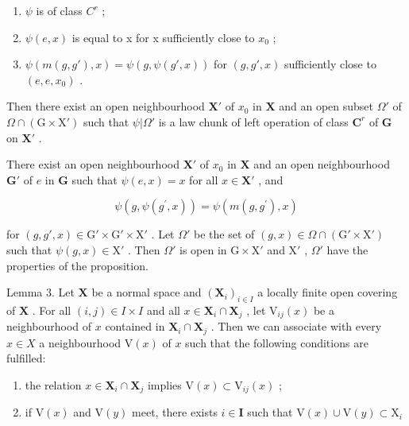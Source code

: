 \begin{enumerate}
\def\labelenumi{(\roman{enumi})}
\item
  \(\psi\) is of class \(C^{r}\) ;
\item
  \(\psi(e, x)\) is equal to x for x sufficiently close to \(x_{0}\) ;
\item
  \(\psi(m(g, g'), x) = \psi(g, \psi(g', x))\) for \((g, g', x)\) sufficiently close to \((e, e, x_0)\) .
\end{enumerate}

Then there exist an open neighbourhood \(\mathbf{X}'\) of \(x_0\) in \(\mathbf{X}\) and an open subset \(\Omega'\) of \(\Omega \cap (\mathrm{G} \times \mathrm{X}')\) such that \(\psi|\Omega'\) is a law chunk of left operation of class \(\mathbf{C}^r\) of \(\mathbf{G}\) on \(\mathbf{X}'\) .

There exist an open neighbourhood \(\mathbf{X}'\) of \(x_0\) in \(\mathbf{X}\) and an open neighbourhood \(\mathbf{G}'\) of \(e\) in \(\mathbf{G}\) such that \(\psi(e, x) = x\) for all \(x \in \mathbf{X}'\) , and

\[
\psi (g, \psi (g ^ {\prime}, x)) = \psi (m (g, g ^ {\prime}), x)
\]

for \((g, g', x) \in \mathrm{G}' \times \mathrm{G}' \times \mathrm{X}'\) . Let \(\Omega'\) be the set of \((g, x) \in \Omega \cap (\mathrm{G}' \times \mathrm{X}')\) such that \(\psi(g, x) \in \mathrm{X}'\) . Then \(\Omega'\) is open in \(\mathrm{G} \times \mathrm{X}'\) and \(\mathrm{X}'\) , \(\Omega'\) have the properties of the proposition.

Lemma 3. Let \(\mathbf{X}\) be a normal space and \((\mathbf{X}_i)_{i\in I}\) a locally finite open covering of \(\mathbf{X}\) . For all \((i,j)\in I\times I\) and all \(x\in \mathbf{X}_i\cap \mathbf{X}_j\) , let \(\mathrm{V}_{ij}(x)\) be a neighbourhood of \(x\) contained in \(\mathbf{X}_i\cap \mathbf{X}_j\) . Then we can associate with every \(x\in X\) a neighbourhood \(\mathrm{V}(x)\) of \(x\) such that the following conditions are fulfilled:

\begin{enumerate}
\def\labelenumi{(\alph{enumi})}
\item
  the relation \(x \in \mathbf{X}_i \cap \mathbf{X}_j\) implies \(\mathrm{V}(x) \subset \mathrm{V}_{ij}(x)\) ;
\item
  if \(\mathrm{V}(x)\) and \(\mathrm{V}(y)\) meet, there exists \(i\in \mathbf{I}\) such that \(\mathrm{V}(x)\cup \mathrm{V}(y)\subset \mathrm{X}_i\)
\end{enumerate}

